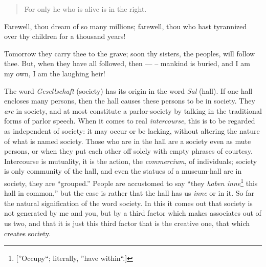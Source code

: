 \begin{quotation}

\noindent{}For only he who is alive is in the right.\end{quotation}

\noindent{}Farewell, thou dream of so many millions; farewell, thou who hast 
tyrannized over thy children for a thousand years!

Tomorrow they carry thee to the grave; soon thy sisters, the peoples, will 
follow thee. But, when they have all followed, then --- -- mankind is buried, 
and I am my own, I am the laughing heir!

\myhrule


The word \textit{Gesellschaft} (society) has its origin in the word 
\textit{Sal} (hall). If one hall encloses many persons, then the hall causes 
these persons to be in society. They \textit{are} in society, and at most 
constitute a parlor-society by talking in the traditional forms of parlor 
speech. When it comes to real \textit{intercourse}, this is to be regarded as 
independent of society: it may occur or be lacking, without altering the 
nature of what is named society. Those who are in the hall are a society even 
as mute persons, or when they put each other off solely with empty phrases of 
courtesy. Intercourse is mutuality, it is the action, the \textit{commercium}, 
of individuals; society is only community of the hall, and even the statues of 
a museum-hall are in society, they are ``grouped.'' People are accustomed to 
say ``they \textit{haben inne}\footnote{[''Occupy``; literally, ''have 
within``.]} this hall in common,'' but the case is rather that the hall has 
us \textit{inne} or in it. So far the natural signification of the word 
society. In this it comes out that society is not generated by me and you, but 
by a third factor which makes associates out of us two, and that it is just 
this third factor that is the creative one, that which creates society.

